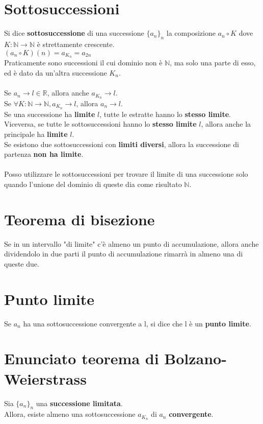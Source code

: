 \documentclass{article}
\begin{document}
\section{Sottosuccessioni}

Si dice \textbf{sottosuccessione} di una successione \(\{a_n\}_n\) la composizione \(a_n \circ K\) dove \(K : \mathbb{N} \to \mathbb{N}\) è strettamente crescente.\\
\((a_n \circ K)(n) = a_{K_n} = a_{2n}\)\\
Praticamente sono successioni il cui dominio non è \(\mathbb{N}\), ma solo una parte di esso, ed è dato da un'altra successione \(K_n\).\\\\
Se \(a_n \to l \in \mathbb{R}\), allora anche \(a_{K_n} \to l\).\\
Se \(\forall K : \mathbb{N} \to \mathbb{N}, a_{K_n} \to l\), allora \(a_n \to l\).\\
Se una successione ha \textbf{limite} \(l\), tutte le estratte hanno lo \textbf{stesso limite}.\\
Viceversa, se tutte le sottosuccessioni hanno lo \textbf{stesso limite} \(l\), allora anche la principale ha \textbf{limite} \(l\).\\
Se esistono due sottosuccessioni con \textbf{limiti diversi}, allora la successione di partenza \textbf{non ha limite}.\\\\
Posso utilizzare le sottosuccessioni per trovare il limite di una successione solo quando l'unione del dominio di queste dia come risultato \(\mathbb{N}\).\\

\section{Teorema di bisezione}
Se in un intervallo "di limite" c'è almeno un punto di accumulazione, allora anche dividendolo in due parti il punto di accumulazione rimarrà in almeno una di queste due.

\section{Punto limite}
Se \(a_n\) ha una sottosuccessione convergente a l, si dice che l è un \textbf{punto limite}.

\section{Enunciato teorema di Bolzano-Weierstrass}
Sia \(\{a_n\}_n\) una \textbf{successione limitata}.\\
Allora, esiste almeno una sottosuccessione \(a_{K_n}\) di \(a_n\) \textbf{convergente}.
\end{document}
